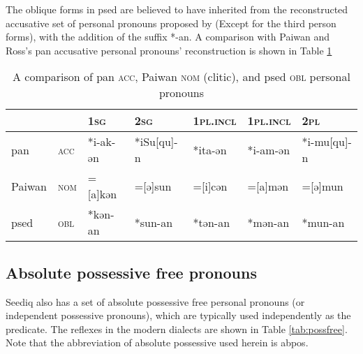 The oblique forms in \acl{psed} are believed to have inherited from the reconstructed accusative set of personal pronouns proposed by \textcite{ross2006} (Except for the third person forms), with the addition of the suffix *-an. A comparison with Paiwan and Ross's \acs{pan} accusative personal pronouns' reconstruction is shown in Table \ref{tab:panacc}

\begin{table}[!htbp]
\centering
\caption{A comparison of \acs{pan} \textsc{acc}, Paiwan \textsc{nom} (clitic), and \acl{psed} \textsc{obl} personal pronouns}
\label{tab:panacc}
\begin{tabular}{lllllll}
\hline
       &     & \textsc{1sg}      & \textsc{2sg}        & \textsc{1pl.incl} & \textsc{1pl.incl} & \textsc{2pl}         \\\hline
\acs{pan}   & \textsc{acc} & *i-ak-ən & *iSu[qu]-n & *ita-ən  & *i-am-ən & *i-mu[qu]-n \\
Paiwan & \textsc{nom} & =[a]kən  & =[ə]sun    & =[i]cən  & =[a]mən  & =[ə]mun     \\
\acl{psed} & \textsc{obl} & *kən-an  & *sun-an    & *tən-an  & *mən-an  & *mun-an    \\ \hline
\end{tabular}
\end{table}

\subsection{Absolute possessive free pronouns}

Seediq also has a set of absolute possessive free personal pronouns (or independent possessive pronouns), which are typically used independently as the predicate. The reflexes in the modern dialects are shown in Table \ref{tab:possfree}. Note that the abbreviation of absolute possessive used herein is \acs{abpos}.

